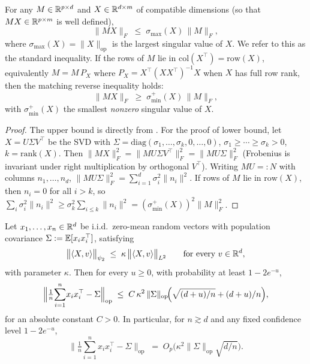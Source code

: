 \begin{lemma}\label{lem:norm-sandwich}
For any $M\in\mathbb{R}^{p\times d}$ and $X\in\mathbb{R}^{d\times m}$ of compatible dimensions (so that $MX\in\mathbb{R}^{p\times m}$ is well defined),
\begin{equation}
\|MX\|_F \;\le\; \sigma_{\max}(X)\,\|M\|_F,
\end{equation}
where $\sigma_{\max}(X)=\|X\|_\text{op}$ is the largest singular value of $X$. We refer to this as the standard inequality. If the rows of $M$ lie in $\mathrm{col}(X^\top)=\mathrm{row}(X)$, equivalently $M=M\,P_{X}$ where $P_X=X^\top(XX^\top)^{-1}X$ when $X$ has full row rank, then the matching reverse inequality holds:
\begin{equation}
\|MX\|_F \;\ge\; \sigma_{\min}^+(X)\,\|M\|_F,
\end{equation}
with $\sigma_{\min}^+(X)$ the smallest \emph{nonzero} singular value of $X$.
\end{lemma}
\begin{proof}

The upper bound is directly from \cite{horn2012matrix}. For the proof of lower bound, let $X=U\Sigma V^\top$ be the SVD with $\Sigma=\mathrm{diag}(\sigma_1,\ldots,\sigma_k,0,\ldots,0)$, $\sigma_1\ge\cdots\ge\sigma_k>0$, $k=\mathrm{rank}(X)$. Then $\|MX\|_F^2=\|MU\Sigma V^\top\|_F^2=\|MU\Sigma\|_F^2$ (Frobenius is invariant under right multiplication by orthogonal $V^\top$). Writing $MU=:N$ with columns $n_1,\ldots,n_d$, $\|MU\Sigma\|_F^2=\sum_{i=1}^d\sigma_i^2\|n_i\|^2$. If rows of $M$ lie in $\mathrm{row}(X)$, then $n_i=0$ for all $i>k$, so $\sum_i\sigma_i^2\|n_i\|^2\ge\sigma_k^2\sum_{i\le k}\|n_i\|^2=(\sigma_{\min}^+(X))^2\|M\|_F^2$.
\end{proof}


\begin{lemma}\label{lem:cov-conc}
Let $x_1,\ldots,x_n\in\mathbb{R}^d$ be i.i.d.\ zero-mean random vectors with population covariance $\Sigma:=\mathbb{E}[x_ix_i^\top]$, satisfying 
\begin{equation}\label{cond_shapeaware}
\bigl\|\langle X,v\rangle\bigr\|_{\psi_2} \;\le\; \kappa\,\bigl\|\langle X,v\rangle\bigr\|_{L^2} \qquad\text{for every } v\in\mathbb{R}^d,
\end{equation}
with parameter $\kappa$. Then for every $u\ge 0$, with probability at least $1-2e^{-u}$,
\begin{equation}
\Bigl\|\tfrac{1}{n}\!\sum_{i=1}^n\! x_ix_i^\top - \Sigma\Bigr\|_\text{op} \;\le\; C\,\kappa^2\,\|\Sigma\|_\text{op}\!\Bigl(\sqrt{(d+u)/n}+(d+u)/n\Bigr),
\end{equation}
for an absolute constant $C>0$. In particular, for $n\gtrsim d$ and any fixed confidence level $1-2e^{-u}$,
\begin{equation}
\bigl\|\tfrac{1}{n}\!\sum_{i=1}^n\! x_ix_i^\top - \Sigma\bigr\|_\text{op} \;=\; O_p\!\bigl(\kappa^2\|\Sigma\|_\text{op}\sqrt{d/n}\bigr).
\end{equation}
\end{lemma}


